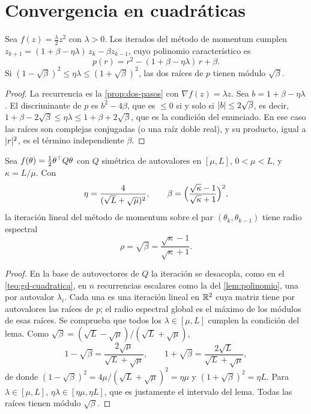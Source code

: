 \section{Convergencia en cuadráticas}

\begin{lema}\label{lem:polinomio}
Sea $f(z)=\frac{\lambda}{2}z^{2}$ con $\lambda>0$. Los iterados del método de momentum cumplen $z_{k+1}=(1+\beta-\eta\lambda)\,z_k-\beta z_{k-1}$, cuyo polinomio característico es
\[
p(r)=r^{2}-(1+\beta-\eta\lambda)\,r+\beta.
\]
Si $(1-\sqrt\beta)^{2}\le\eta\lambda\le(1+\sqrt\beta)^{2}$, las dos raíces de $p$ tienen módulo $\sqrt\beta$.
\end{lema}

\begin{proof}
La recurrencia es la \cref{prop:dos-pasos} con $\nabla f(z)=\lambda z$. Sea $b=1+\beta-\eta\lambda$. El discriminante de $p$ es $b^{2}-4\beta$, que es $\le 0$ si y solo si $\lvert b\rvert\le 2\sqrt\beta$, es decir, $1+\beta-2\sqrt\beta\le\eta\lambda\le 1+\beta+2\sqrt\beta$, que es la condición del enunciado. En ese caso las raíces son complejas conjugadas (o una raíz doble real), y su producto, igual a $\lvert r\rvert^{2}$, es el término independiente $\beta$.
\end{proof}

\begin{teorema}\label{teo:heavy-ball}
Sea $f(\theta)=\frac12\theta^{\top} Q\theta$ con $Q$ simétrica de autovalores en $[\mu,L]$, $0<\mu<L$, y $\kappa=L/\mu$. Con
\[
\eta=\frac{4}{(\sqrt L+\sqrt\mu)^{2}},\qquad\beta=\Bigl(\frac{\sqrt\kappa-1}{\sqrt\kappa+1}\Bigr)^{2},
\]
la iteración lineal del método de momentum sobre el par $(\theta_k,\theta_{k-1})$ tiene radio espectral
\[
\rho=\sqrt\beta=\frac{\sqrt\kappa-1}{\sqrt\kappa+1}.
\]
\end{teorema}

\begin{proof}
En la base de autovectores de $Q$ la iteración se desacopla, como en el \cref{teo:gd-cuadratica}, en $n$ recurrencias escalares como la del \cref{lem:polinomio}, una por autovalor $\lambda_i$. Cada una es una iteración lineal en $\mathbb{R}^{2}$ cuya matriz tiene por autovalores las raíces de $p$; el radio espectral global es el máximo de los módulos de esas raíces. Se comprueba que todos los $\lambda\in[\mu,L]$ cumplen la condición del lema. Como $\sqrt\beta=(\sqrt L-\sqrt\mu)/(\sqrt L+\sqrt\mu)$,
\[
1-\sqrt\beta=\frac{2\sqrt\mu}{\sqrt L+\sqrt\mu},\qquad 1+\sqrt\beta=\frac{2\sqrt L}{\sqrt L+\sqrt\mu},
\]
de donde $(1-\sqrt\beta)^{2}=4\mu/(\sqrt L+\sqrt\mu)^{2}=\eta\mu$ y $(1+\sqrt\beta)^{2}=\eta L$. Para $\lambda\in[\mu,L]$, $\eta\lambda\in[\eta\mu,\eta L]$, que es justamente el intervalo del lema. Todas las raíces tienen módulo $\sqrt\beta$.
\end{proof}

